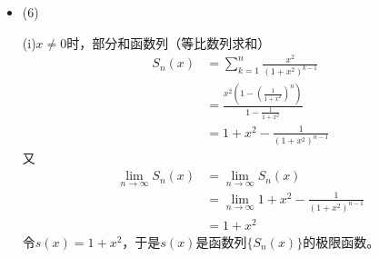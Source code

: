 \documentclass{article}
\begin{document}
\begin{itemize}
        (ii)对每一个$x \in (-\infty, +\infty)$，
        \begin{align*}
          \frac{1}{x^2 + n} \geq \frac{1}{x^2 + n + 1}
        \end{align*}
        即$\{v_n(x)\}$是单减的。

        (iii)
        \begin{align*}
          \lim\limits_{n \to \infty} \frac{1}{x^2 + n} = 0
        \end{align*}
        令$f(x) = 0$，于是$f(x)$是函数列的极限函数。

        考虑
        \begin{align*}
          \sup\limits_{x \in (-\infty, \infty)} |v_n(x) - f(x)|
           & = \sup\limits_{x \in (-\infty, \infty)} \frac{1}{x^2 + n} \\
           & = \frac{1}{n}
        \end{align*}
        于是
        \begin{align*}
          \lim\limits_{n \to \infty} \sup\limits_{x \in (-\infty, \infty)} |v_n(x) - f(x)|
           & = \lim\limits_{n \to \infty} \frac{1}{n} \\
           & = 0
        \end{align*}
        故$v_n(x) \rightrightarrows 0$。

        综上，由A-D判别法，函数项级数$\sum \frac{(-1)^{n - 1}}{x^2 + n}$一致收敛。

  \item (6)

        (i)$x \neq 0$时，部分和函数列（等比数列求和）
        \begin{align*}
          S_n(x) & = \sum_{k = 1}^n \frac{x^2}{(1 + x^2)^{k - 1}}                  \\
                 & = \frac{x^2(1 - (\frac{1}{1 + x^2})^n) }{1 - \frac{1}{1 + x^2}} \\
                 & = 1 + x^2 - \frac{1}{(1 + x^2)^{n - 1}}
        \end{align*}
        又
        \begin{align*}
          \lim\limits_{n \to \infty} S_n(x)
           & = \lim\limits_{n \to \infty} S_n(x)                                \\
           & = \lim\limits_{n \to \infty} 1 + x^2 - \frac{1}{(1 + x^2)^{n - 1}} \\
           & = 1 + x^2
        \end{align*}
        令$s(x) = 1 + x^2$，于是$s(x)$是函数列$\{S_n(x)\}$的极限函数。



\end{itemize}
\end{document}
